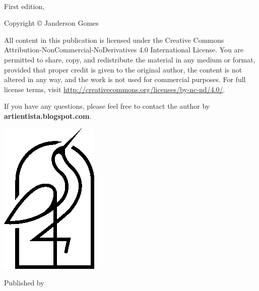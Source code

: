 {\small
\setlength{\parindent}{0em}\setlength{\parskip}{1em}
~
\vfill

First edition, \editionyear{}

Copyright \copyright{} \editionyear{} Janderson Gomes

All content in this publication is licensed under the Creative Commons 
Attribution‑NonCommercial‑NoDerivatives 4.0 International License. You 
are permitted to share, copy, and redistribute the material in any 
medium or format, provided that proper credit is given to the original 
author, the content is not altered in any way, and the work is not used 
for commercial purposes. For full license terms, visit 
\url{http://creativecommons.org/licenses/by-nc-nd/4.0/}.

If you have any questions, please feel free to contact the author by \\ \textbf{artientista.blogspot.com}.


\ifx\isbn\undefined\else\if\relax\detokenize\expandafter{\isbn}\relax{}\fi\fi

\includegraphics[width=0.07\linewidth]{frontmatter/logo-black.png}

Published by \publisher{}
}
